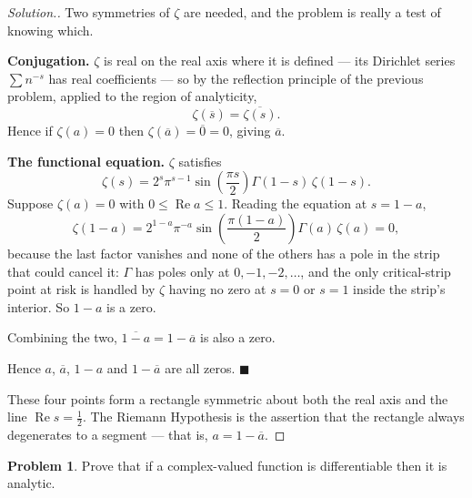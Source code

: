 \documentclass[11pt,a4paper]{article}
\theoremstyle{definition}
\newtheorem{problemx}{Problem}[section]
\newenvironment{problem}{\begin{problemx}}{\end{problemx}}
\newenvironment{solution}
  {\renewcommand{\qedsymbol}{}\begin{proof}[\textit{Solution}.]}
  {\end{proof}}
\begin{document}
\begin{solution}
Two symmetries of $\zeta$ are needed, and the problem is really a test of knowing
which.

\textbf{Conjugation.} $\zeta$ is real on the real axis where it is defined --- its
Dirichlet series $\sum n^{-s}$ has real coefficients --- so by the reflection
principle of the previous problem, applied to the region of analyticity,
$$\zeta\!\left(\overline{s}\right) = \overline{\zeta(s)} .$$
Hence if $\zeta(a) = 0$ then $\zeta(\overline{a}) = \overline{0} = 0$, giving
$\overline{a}$.

\textbf{The functional equation.} $\zeta$ satisfies
$$\zeta(s) = 2^{s}\pi^{s-1}\sin\!\left(\frac{\pi s}{2}\right)\Gamma(1-s)\,\zeta(1-s).$$
Suppose $\zeta(a) = 0$ with $0 \leq \operatorname{Re}a \leq 1$. Reading the
equation at $s = 1-a$,
$$\zeta(1-a) = 2^{1-a}\pi^{-a}\sin\!\left(\frac{\pi(1-a)}{2}\right)\Gamma(a)\,\zeta(a) = 0,$$
because the last factor vanishes and none of the others has a pole in the strip
that could cancel it: $\Gamma$ has poles only at $0,-1,-2,\ldots$, and the only
critical-strip point at risk is handled by $\zeta$ having no zero at $s = 0$ or
$s=1$ inside the strip's interior. So $1-a$ is a zero.

Combining the two, $\overline{1-a} = 1-\overline{a}$ is also a zero.

Hence $a$, $\overline{a}$, $1-a$ and $1-\overline{a}$ are all zeros. $\blacksquare$

These four points form a rectangle symmetric about both the real axis and the line
$\operatorname{Re}s = \tfrac12$. The Riemann Hypothesis is the assertion that the
rectangle always degenerates to a segment --- that is, $a = 1-\overline{a}$.
\end{solution}


\begin{problem}
Prove that if a complex-valued function is differentiable then it is analytic.
\end{problem}
\end{document}
